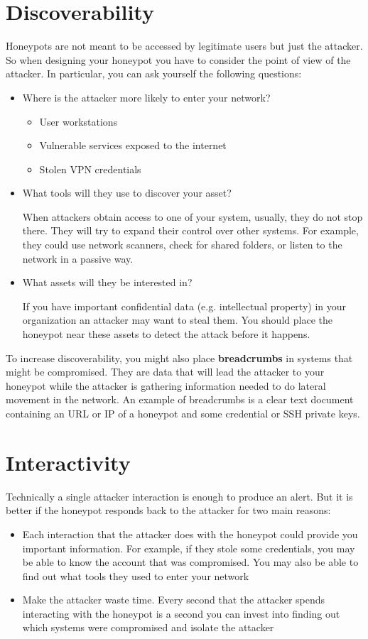 \documentclass[epsfig,a4paper,11pt,titlepage,oneside,openany]{book}
\begin{document}
\section{Discoverability}
Honeypots are not meant to be accessed by legitimate users but just the attacker. So when designing your honeypot you have to consider the point of view of the attacker.
In particular, you can ask yourself the following questions:
\begin{itemize}
\item Where is the attacker more likely to enter your network?
	\begin{itemize}
	\item User workstations
	\item Vulnerable services exposed to the internet
	\item Stolen VPN credentials
	\end{itemize}
\item What tools will they use to discover your asset?

When attackers obtain access to one of your system, usually, they do not stop there. They will try to expand their control over other systems. For example, they could use network scanners, check for shared folders, or listen to the network in a passive way.
\item What assets will they be interested in?

If you have important confidential data (e.g. intellectual property) in your organization an attacker may want to steal them. You should place the honeypot near these assets to detect the attack before it happens.

\end{itemize}

To increase discoverability, you might also place \textbf{breadcrumbs} in systems that might be compromised. They are data that will lead the attacker to your honeypot while the attacker is gathering information needed to do lateral movement in the network. An example of breadcrumbs is a clear text document containing an URL or IP of a honeypot and some credential or SSH private keys.

\section{Interactivity}

Technically a single attacker interaction is enough to produce an alert. But it is better if the honeypot responds back to the attacker for two main reasons:
\begin{itemize}
\item Each interaction that the attacker does with the honeypot could provide you important information. For example, if they stole some credentials, you may be able to know the account that was compromised. You may also be able to find out what tools they used to enter  your network
\item Make the attacker waste time. Every second that the attacker spends interacting with the honeypot is a second you can invest into finding out which systems were compromised and isolate the attacker
\end{itemize}
\end{document}

